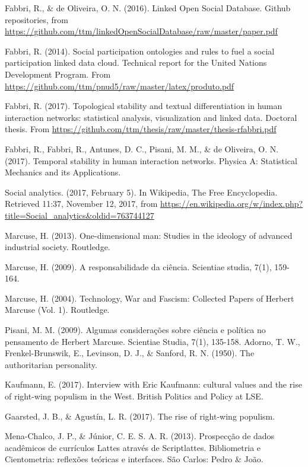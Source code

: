 \documentclass[letterpaper,10pt]{article}
\begin{document}
\begin{thebibliography}{99}

	Fabbri, R., \& de Oliveira, O. N. (2016). Linked Open Social Database. Github repositories, from \url{https://github.com/ttm/linkedOpenSocialDatabase/raw/master/paper.pdf}

Fabbri, R. (2014). Social participation ontologies and rules to fuel a social participation linked data cloud.
	Technical report for the United Nations Development Program.
		From \url{https://github.com/ttm/pnud5/raw/master/latex/produto.pdf}

Fabbri, R. (2017). Topological stability and textual differentiation in human interaction networks:
		statistical analysis, visualization and linked data. Doctoral thesis.
		From \url{https://github.com/ttm/thesis/raw/master/thesis-rfabbri.pdf}

Fabbri, R., Fabbri, R., Antunes, D. C., Pisani, M. M., \& de Oliveira, O. N. (2017). Temporal stability in human interaction networks. Physica A: Statistical Mechanics and its Applications.

	Social analytics. (2017, February 5). In Wikipedia, The Free Encyclopedia. Retrieved 11:37, November 12, 2017, from \url{https://en.wikipedia.org/w/index.php?title=Social\_analytics\&oldid=763744127}

	Marcuse, H. (2013). One-dimensional man: Studies in the ideology of advanced industrial society. Routledge.

	Marcuse, H. (2009). A responsabilidade da ciência. Scientiae studia, 7(1), 159-164.

	Marcuse, H. (2004). Technology, War and Fascism: Collected Papers of Herbert Marcuse (Vol. 1). Routledge.

	Pisani, M. M. (2009). Algumas considerações sobre ciência e política no pensamento de Herbert Marcuse. Scientiae Studia, 7(1), 135-158.
	Adorno, T. W., Frenkel-Brunswik, E., Levinson, D. J., \& Sanford, R. N. (1950). The authoritarian personality.

Kaufmann, E. (2017). Interview with Eric Kaufmann: cultural values and the rise of right-wing populism in the West. British Politics and Policy at LSE.

	Gaarsted, J. B., \& Agustín, L. R. (2017). The rise of right-wing populism.

	Mena-Chalco, J. P., \& Júnior, C. E. S. A. R. (2013). Prospecção de dados acadêmicos de currículos Lattes através de Scriptlattes. Bibliometria e Cientometria: reflexões teóricas e interfaces. São Carlos: Pedro \& João.


\end{thebibliography}
\end{document}
